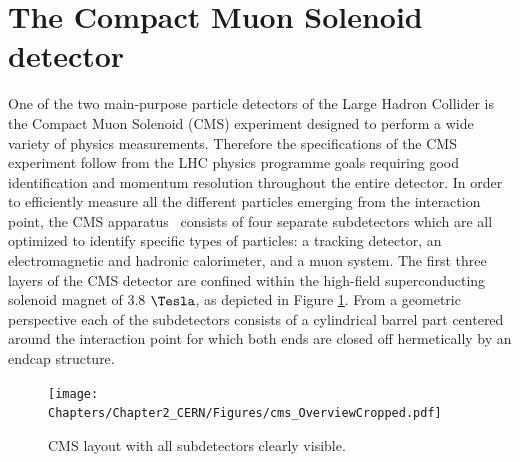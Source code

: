 \section{The Compact Muon Solenoid detector}\label{sec::CMS}

One of the two main-purpose particle detectors of the Large Hadron Collider is the Compact Muon Solenoid (CMS) experiment designed to perform a wide variety of physics measurements. Therefore the specifications of the CMS experiment follow from the LHC physics programme goals requiring good identification and momentum resolution throughout the entire detector.
In order to efficiently measure all the different particles emerging from the interaction point, the CMS apparatus~\cite{CMSTDR} consists of four separate subdetectors which are all optimized to identify specific types of particles: a tracking detector, an electromagnetic and hadronic calorimeter, and a muon system. 
The first three layers of the CMS detector are confined within the high-field superconducting solenoid magnet of 3.8 $\Tesla$, as depicted in Figure \ref{fig::CMSFig}. 
From a geometric perspective each of the subdetectors consists of a cylindrical barrel part centered around the interaction point for which both ends are closed off hermetically by an endcap structure.
\begin{figure}[h!t]
 \centering
 \texttt{[image: Chapters/Chapter2\_CERN/Figures/cms\_OverviewCropped.pdf]}%
 \caption{CMS layout with all subdetectors clearly visible.} \label{fig::CMSFig}
\end{figure}

